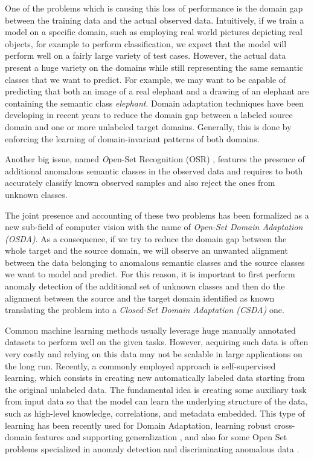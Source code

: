 \documentclass[10pt,twocolumn,letterpaper]{article}
\begin{document}
One of the problems which is causing this loss of performance is the domain gap between the training data and the actual observed data. Intuitively, if we train a model on a specific domain,
such as employing real world pictures depicting real objects, for example to perform classification, we expect that the model will perform well on a fairly large variety of test cases.
However, the actual data present a huge variety on the domains while still representing the same semantic classes that we want to predict.
For example, we may want to be capable of predicting that both an image of a real elephant and a drawing of an elephant are containing the semantic class \textit{elephant}.
Domain adaptation techniques have been developing in recent years to reduce the domain gap between a labeled source domain and one or more unlabeled target domains.
Generally, this is done by enforcing the learning of domain-invariant patterns of both domains.

Another big issue,
named {\textit Open-Set Recognition (OSR)} \cite{OSRsurvey},
features the presence of additional anomalous semantic classes in the observed data and requires to both accurately classify
known observed samples and also reject the ones from unknown classes.

The joint presence and accounting of these two problems has been formalized as a new sub-field of computer vision with the name of \textit{Open-Set Domain Adaptation (OSDA)}.
As a consequence, 
if we try to reduce the domain gap between the whole target and the source domain, 
we will observe an unwanted alignment between
the data belonging to anomalous semantic classes and the source classes we want to model and predict.
For this reason, 
it is important to first perform anomaly detection of the additional set of unknown classes
and then do the alignment between the source and the target domain identified as known
translating the problem into a \textit{Closed-Set Domain Adaptation (CSDA)} one.

Common machine learning methods usually leverage huge manually annotated datasets to perform well on the given tasks.
However, 
acquiring such data is often very costly and relying on this data may not be scalable in large applications on the long run.
Recently, 
a commonly employed approach is self-supervised learning, 
which consists in creating new automatically labeled data starting from the original unlabeled data.
The fundamental idea is creating some auxiliary task from input data so that the model can learn the underlying structure of the data,
such as high-level knowledge, correlations, and metadata embedded.
This type of learning has been recently used for Domain Adaptation, 
learning robust cross-domain features and supporting generalization \cite{CarlucciJigsaw,SelfSupervisedXu},
and also for some Open Set problems specialized in anomaly detection and discriminating anomalous data \cite{bergman2020classificationbased,GeoTran}. 
\end{document}
